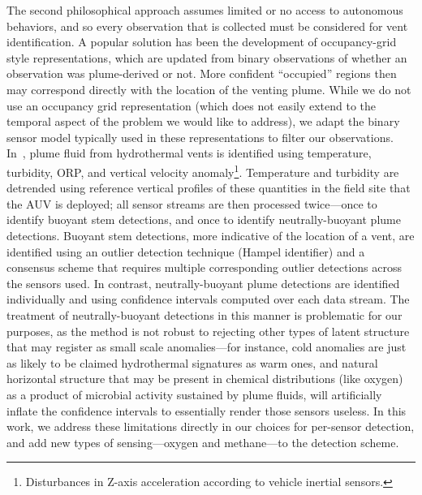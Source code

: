The second philosophical approach assumes limited or no access to autonomous behaviors, and so every observation that is collected must be considered for vent identification. A popular solution has been the development of occupancy-grid style representations\autocite{jakuba2008autonomous,peng2014dynamic}, which are updated from binary observations of whether an observation was plume-derived or not. More confident ``occupied'' regions then may correspond directly with the location of the venting plume. While we do not use an occupancy grid representation (which does not easily extend to the temporal aspect of the problem we would like to address), we adapt the binary sensor model typically used in these representations to filter our observations. In~\cite{jakuba2007stochastic}, plume fluid from hydrothermal vents is identified using temperature, turbidity, ORP, and vertical velocity anomaly\footnote{Disturbances in Z-axis acceleration according to vehicle inertial sensors.}. Temperature and turbidity are detrended using reference vertical profiles of these quantities in the field site that the AUV is deployed; all sensor streams are then processed twice---once to identify buoyant stem detections, and once to identify neutrally-buoyant plume detections. Buoyant stem detections, more indicative of the location of a vent, are identified using an outlier detection technique (Hampel identifier\autocite{liu2004line}) and a consensus scheme that requires multiple corresponding outlier detections across the sensors used. In contrast, neutrally-buoyant plume detections are identified individually and using confidence intervals computed over each data stream. The treatment of neutrally-buoyant detections in this manner is problematic for our purposes, as the method is not robust to rejecting other types of latent structure that may register as small scale anomalies---for instance, cold anomalies are just as likely to be claimed hydrothermal signatures as warm ones, and natural horizontal structure that may be present in chemical distributions (like oxygen) as a product of microbial activity sustained by plume fluids, will artificially inflate the confidence intervals to essentially render those sensors useless. In this work, we address these limitations directly in our choices for per-sensor detection, and add new types of sensing---oxygen and methane---to the detection scheme.

